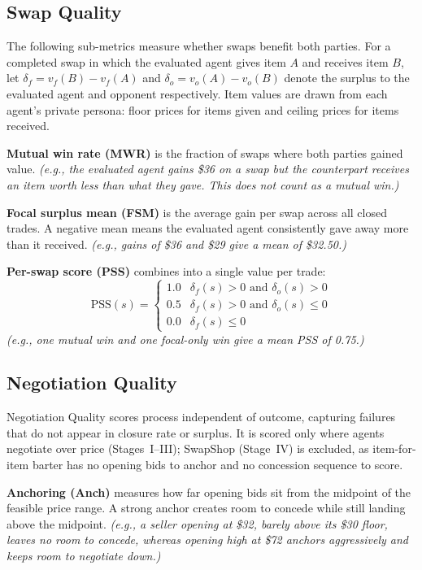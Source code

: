 \documentclass{article} %
\newcommand{\eg}[1]{\textit{\small(e.g., #1)}}
\begin{document}
\subsection{Swap Quality}
The following sub-metrics measure whether swaps benefit both parties. For a completed swap in which the evaluated agent gives item $A$ and receives item $B$, let $\delta_f = v_f(B) - v_f(A)$ and $\delta_o = v_o(A) - v_o(B)$ denote the surplus to the evaluated agent and opponent respectively. Item values are drawn from each agent's private persona: floor prices for items given and ceiling prices for items received.

\textbf{Mutual win rate (MWR)} is the fraction of swaps where both parties gained value. \eg{the evaluated agent gains \$36 on a swap but the counterpart receives an item worth less than what they gave. This does not count as a mutual win.}

\textbf{Focal surplus mean (FSM)} is the average gain per swap across all closed trades. A negative mean means the evaluated agent consistently gave away more than it received. \eg{gains of \$36 and \$29 give a mean of \$32.50.}

\textbf{Per-swap score (PSS)} combines into a single value per trade:
\begin{equation}
\mathrm{PSS}(s) = \begin{cases} 1.0 & \delta_f(s) > 0 \text{ and } \delta_o(s) > 0 \\ 0.5 & \delta_f(s) > 0 \text{ and } \delta_o(s) \leq 0 \\ 0.0 & \delta_f(s) \leq 0 \end{cases}
\end{equation}
\eg{one mutual win and one focal-only win give a mean PSS of 0.75.}

\subsection{Negotiation Quality}
Negotiation Quality scores process independent of outcome, capturing failures that do not appear in closure rate or surplus. It is scored only where agents negotiate over price (Stages~I--III); SwapShop (Stage~IV) is excluded, as item-for-item barter has no opening bids to anchor and no concession sequence to score.

\textbf{Anchoring (Anch)} measures how far opening bids sit from the midpoint of the feasible price range. A strong anchor creates room to concede while still landing above the midpoint. \eg{a seller opening at \$32, barely above its \$30 floor, leaves no room to concede, whereas opening high at \$72 anchors aggressively and keeps room to negotiate down.}
\end{document}
